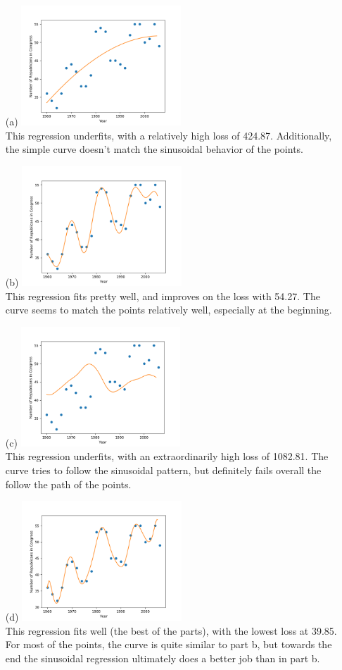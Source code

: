 \documentclass[submit]{harvardml}
\begin{document}
\begin{itemize}
\item[(a)]
    \includegraphics[width=6cm]{part_a_years.png} \\
    This regression underfits, with a relatively high loss of 424.87.
    Additionally, the simple curve doesn't match the sinusoidal behavior of the
    points.
\item[(b)]
    \includegraphics[width=6cm]{part_b_years.png} \\
    This regression fits pretty well, and improves on the loss with 54.27. The
    curve seems to match the points relatively well, especially at the
    beginning.
\item[(c)]
    \includegraphics[width=6cm]{part_c_years.png} \\
    This regression underfits, with an extraordinarily high loss of 1082.81.
    The curve tries to follow the sinusoidal pattern, but definitely fails
    overall the follow the path of the points.
\item[(d)]
    \includegraphics[width=6cm]{part_d_years.png} \\
    This regression fits well (the best of the parts), with the lowest loss at
    39.85. For most of the points, the curve is quite similar to part b, but
    towards the end the sinusoidal regression ultimately does a better job than
    in part b.


\end{itemize}
\end{document}

